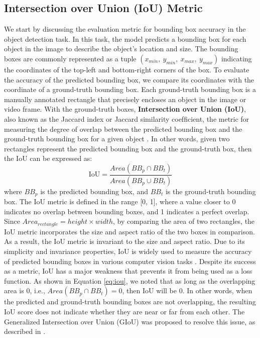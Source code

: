 \subsection{Intersection over Union (IoU) Metric}  \label{subsec:iou_metric}
We start by discussing the evaluation metric for bounding box accuracy in the object detection task. In this task, the model predicts a bounding box for each object in the image to describe the object's location and size. The bounding boxes are commonly represented as a tuple $(x_{min},\ y_{min},\ x_{max},\ y_{max})$ indicating the coordinates of the top-left and bottom-right corners of the box. To evaluate the accuracy of the predicted bounding box, we compare its coordinates with the coordinate of a ground-truth bounding box. Each ground-truth bounding box is a manually annotated rectangle that precisely encloses an object in the image or video frame. With the ground-truth boxes, \textbf{Intersection over Union (IoU)}, also known as the Jaccard index or Jaccard similarity coefﬁcient, the metric for measuring the degree of overlap between the predicted bounding box and the ground-truth bounding box for a given object \cite{generalized_iou}. In other words, given two rectangles represent the predicted bounding box and the ground-truth box, then the IoU can be expressed as:
\begin{equation}
    \text{IoU} = \frac{Area(BB_p \cap BB_t)}{Area(BB_p \cup BB_t)} \label{eq:iou}
\end{equation}
where $BB_p$ is the predicted bounding box, and $BB_t$ is the ground-truth bounding box. The IoU metric is defined in the range [0, 1], where a value closer to 0 indicates no overlap between bounding boxes, and 1 indicates a perfect overlap. Since $Area_{rectangle} = height \times width$, by comparing the area of two rectangles, the IoU metric incorporates the size and aspect ratio of the two boxes in comparison. As a result, the IoU metric is invariant to the size and aspect ratio. Due to its simplicity and invariance properties, IoU is widely used to measure the accuracy of predicted bounding boxes in various computer vision tasks \cite{generalized_iou}. Despite its success as a metric, IoU has a major weakness that prevents it from being used as a loss function. As shown in Equation \ref{eq:iou}, we noted that as long as the overlapping area is 0, i.e., $Area(BB_p \cap BB_t) = 0$, then IoU will be 0. In other words, when the predicted and ground-truth bounding boxes are not overlapping, the resulting IoU score does not indicate whether they are near or far from each other. The Generalized Intersection over Union (GIoU) was proposed to resolve this issue, as described in \cite{generalized_iou}.


